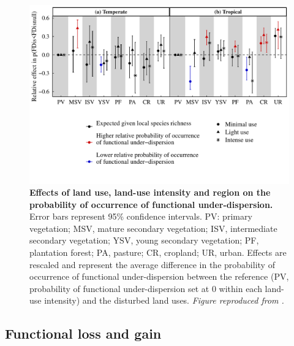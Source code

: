 \begin{figure}[h!]
\centering
\includegraphics[scale=0.75]{figures/Chapter_FD/Figure4_new}
\caption[Effects of land use, land-use intensity and region on the probability of occurrence of functional under-dispersion.]{\textbf{Effects of land use, land-use intensity and region on the probability of occurrence of functional under-dispersion.} Error bars represent 95\% confidence intervals. PV: primary vegetation; MSV, mature secondary vegetation; ISV, intermediate secondary vegetation; YSV, young secondary vegetation; PF, plantation forest; PA, pasture; CR, cropland; UR, urban. Effects are rescaled and represent the average difference in the probability of occurrence of functional under-dispersion between the reference (PV, probability of functional under-dispersion set at 0 within each land-use intensity) and the disturbed land uses. \textit{Figure reproduced from \citet{Etard2021}.}}
\label{chap3_fig4}
\end{figure}

\subsection{Functional loss and gain}

